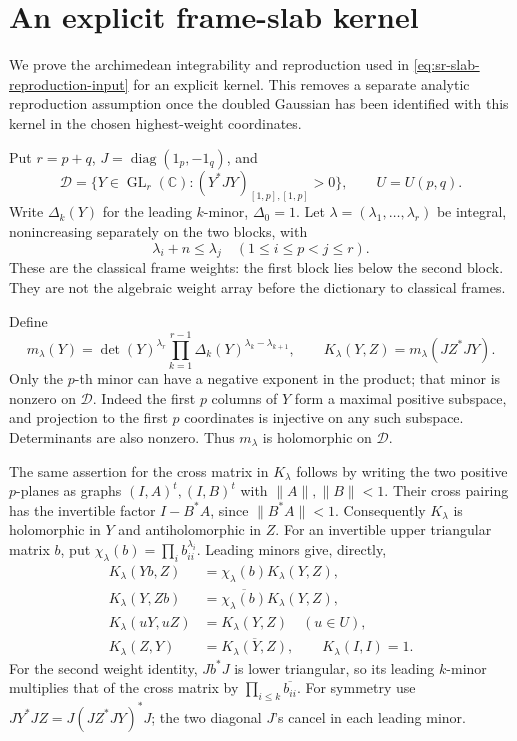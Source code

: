 \section{An explicit frame-slab kernel}
\label{sec:sr-frame-slab-kernel}

We prove the archimedean integrability and reproduction used in
\eqref{eq:sr-slab-reproduction-input} for an explicit kernel.
This removes a separate analytic reproduction assumption once the
doubled Gaussian has been identified with this kernel in the chosen
highest-weight coordinates.

Put \(r=p+q\), \(J=\operatorname{diag}(1_p,-1_q)\), and
\[
 \mathcal D=\{Y\in\operatorname{GL}_r(\mathbb C):
             (Y^*JY)_{[1,p],[1,p]}>0\},\qquad U=U(p,q).
\]
Write \(\Delta_k(Y)\) for the leading \(k\)-minor,
\(\Delta_0=1\).  Let \(\lambda=(\lambda_1,\ldots,\lambda_r)\)
be integral, nonincreasing separately on the two blocks, with
\begin{equation}\label{eq:sr-classical-weight-gap}
 \lambda_i+n\le\lambda_j
           \quad(1\le i\le p<j\le r).
\end{equation}
These are the classical frame weights: the first block lies below
the second block.  They are not the algebraic weight array before
the dictionary to classical frames.

Define
\[
 m_\lambda(Y)=
    \det(Y)^{\lambda_r}
       \prod_{k=1}^{r-1}
          \Delta_k(Y)^{\lambda_k-\lambda_{k+1}},\qquad
 K_\lambda(Y,Z)=m_\lambda(JZ^*JY).
\]
Only the \(p\)-th minor can have a negative exponent in the
product; that minor is nonzero on \(\mathcal D\).
Indeed the first \(p\) columns of \(Y\) form a maximal positive
subspace, and projection to the first \(p\) coordinates is
injective on any such subspace.  Determinants are also nonzero.
Thus \(m_\lambda\) is holomorphic on \(\mathcal D\).

The same assertion for the cross matrix in \(K_\lambda\) follows
by writing the two positive \(p\)-planes as graphs
\((I,A)^t,(I,B)^t\) with \(\|A\|,\|B\|<1\).
Their cross pairing has the invertible factor
\(I-B^*A\), since \(\|B^*A\|<1\).
Consequently \(K_\lambda\) is holomorphic in \(Y\) and
antiholomorphic in \(Z\).
For an invertible upper triangular matrix \(b\), put
\(\chi_\lambda(b)=\prod_i b_{ii}^{\lambda_i}\).
Leading minors give, directly,
\begin{align}
 K_\lambda(Yb,Z)&=\chi_\lambda(b)K_\lambda(Y,Z),\label{eq:sr-kernel-weight}\\
 K_\lambda(Y,Zb)&=\overline{\chi_\lambda(b)}K_\lambda(Y,Z),\nonumber\\
 K_\lambda(uY,uZ)&=K_\lambda(Y,Z)\quad(u\in U),\nonumber\\
 K_\lambda(Z,Y)&=\overline{K_\lambda(Y,Z)},\qquad
 K_\lambda(I,I)=1.\nonumber
\end{align}
For the second weight identity, \(Jb^*J\) is lower triangular,
so its leading \(k\)-minor multiplies that of the cross matrix
by \(\prod_{i\le k}\overline{b_{ii}}\).
For symmetry use
\(JY^*JZ=J(JZ^*JY)^*J\); the two diagonal \(J\)'s cancel in
each leading minor.


